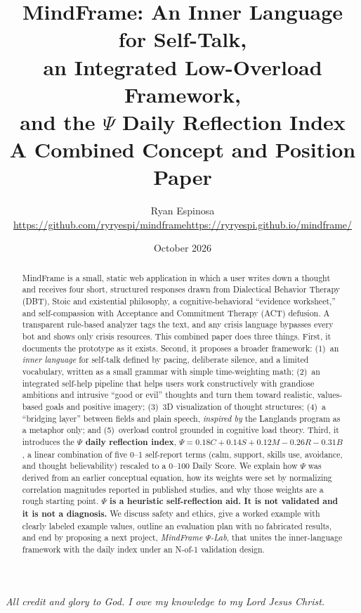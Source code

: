 \documentclass[11pt]{article}
\title{\textbf{MindFrame: An Inner Language for Self-Talk,\\ an Integrated Low-Overload Framework,\\ and the $\Psi$ Daily Reflection Index}\\[4pt]
\large A Combined Concept and Position Paper}
\author{Ryan Espinosa\\[2pt]
\small\url{https://github.com/ryryespi/mindframe}\quad\textbullet\quad\url{https://ryryespi.github.io/mindframe/}}
\date{October 2026}
\begin{document}
\maketitle

\begin{center}
\emph{All credit and glory to God. I owe my knowledge to my Lord Jesus Christ.}
\end{center}
\vspace{4pt}

\begin{abstract}
\noindent MindFrame is a small, static web application in which a user writes down a thought and receives four short, structured responses drawn from Dialectical Behavior Therapy (DBT), Stoic and existential philosophy, a cognitive-behavioral ``evidence worksheet,'' and self-compassion with Acceptance and Commitment Therapy (ACT) defusion. A transparent rule-based analyzer tags the text, and any crisis language bypasses every bot and shows only crisis resources. This combined paper does three things. First, it documents the prototype as it exists. Second, it proposes a broader framework: (1)~an \emph{inner language} for self-talk defined by pacing, deliberate silence, and a limited vocabulary, written as a small grammar with simple time-weighting math; (2)~an integrated self-help pipeline that helps users work constructively with grandiose ambitions and intrusive ``good or evil'' thoughts and turn them toward realistic, values-based goals and positive imagery; (3)~3D visualization of thought structures; (4)~a ``bridging layer'' between fields and plain speech, \emph{inspired by} the Langlands program as a metaphor only; and (5)~overload control grounded in cognitive load theory. Third, it introduces the \textbf{$\Psi$ daily reflection index}, $\Psi = 0.18C + 0.14S + 0.12M - 0.26R - 0.31B$, a linear combination of five 0--1 self-report terms (calm, support, skills use, avoidance, and thought believability) rescaled to a 0--100 Daily Score. We explain how $\Psi$ was derived from an earlier conceptual equation, how its weights were set by normalizing correlation magnitudes reported in published studies, and why those weights are a rough starting point. \textbf{$\Psi$ is a heuristic self-reflection aid. It is not validated and it is not a diagnosis.} We discuss safety and ethics, give a worked example with clearly labeled example values, outline an evaluation plan with no fabricated results, and end by proposing a next project, \emph{MindFrame $\Psi$-Lab}, that unites the inner-language framework with the daily index under an N-of-1 validation design.
\end{abstract}
\end{document}
